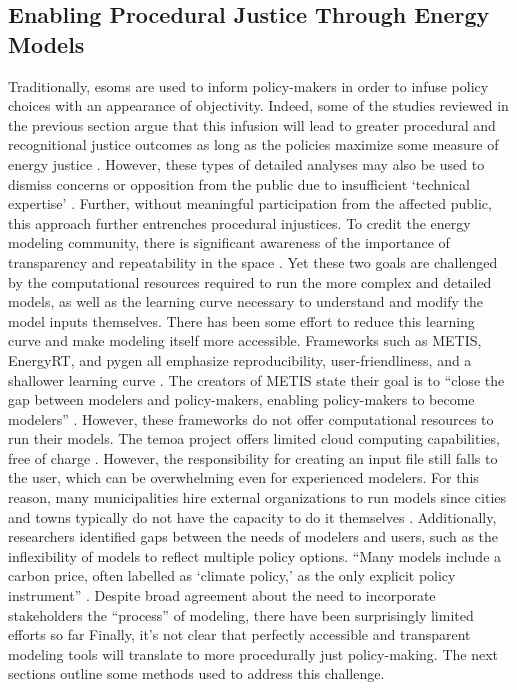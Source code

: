 \subsection{Enabling Procedural Justice Through Energy Models}

Traditionally, \acp{esom} are used to inform policy-makers \cite{li_open_2020}
in order to infuse policy choices with an appearance of objectivity. Indeed,
some of the studies reviewed in the previous section argue that this infusion
will lead to greater procedural and recognitional justice outcomes as long as
the policies maximize some measure of energy justice
\cite{chapman_prioritizing_2018, heffron_resolving_2015}. However, these types
of detailed analyses may also be used to dismiss concerns or opposition from the
public due to insufficient `technical expertise' \cite{johnson_dakota_2021,
susser_better_2022}. Further, without meaningful participation from the affected
public, this approach further entrenches procedural injustices. To credit the
energy modeling community, there is significant awareness of the importance of
transparency and repeatability in the space \cite{decarolis_case_2012,
pfenninger_energy_2014, pfenninger_openmod_2022, forster_open_2022,
hilpert_open_2018}. Yet these two goals are challenged by the computational
resources required to run the more complex and detailed models, as well as the
learning curve necessary to understand and modify the model inputs themselves.
There has been some effort to reduce this learning curve and make modeling
itself more accessible. Frameworks such as METIS, EnergyRT, and \ac{pygen} all
emphasize reproducibility, user-friendliness, and a shallower learning curve
\cite{sakellaris_metis_2018, lugovoy_energyrt_2022, dotson_python_2021}. The
creators of METIS state their goal is to ``close the gap between modelers and
policy-makers, enabling policy-makers to become modelers''
\cite{sakellaris_metis_2018}. However, these frameworks do not offer
computational resources to run their models. The \ac{temoa} project offers
limited cloud computing capabilities, free of charge
\cite{temoa_project_temoa_2023}. However, the responsibility for creating an
input file still falls to the user, which can be overwhelming even for
experienced modelers. For this reason, many municipalities hire external
organizations to run models since cities and towns typically do not have the
capacity to do it themselves \cite{ben_amer_too_2020, johannsen_designing_2021}.
Additionally, researchers identified gaps between the needs of modelers and
users, such as the inflexibility of models to reflect multiple policy options.
``Many models include a carbon price, often labelled as `climate policy,' as the
only explicit policy instrument'' \cite{susser_better_2022}. Despite broad
agreement about the need to incorporate stakeholders the ``process'' of
modeling, there have been surprisingly limited efforts so far
\cite{ben_amer_too_2020,johannsen_designing_2021,susser_better_2022} Finally,
it's not clear that perfectly accessible and transparent modeling tools will
translate to more procedurally just policy-making. The next sections outline
some methods used to address this challenge.

